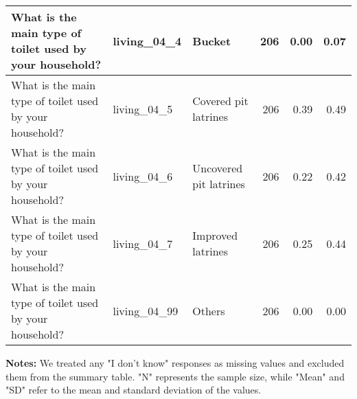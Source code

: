 \begin{landscape}
\begin{longtable}{|p{10cm}|l|p{3cm}|r|r|r|}
\hline
What is the main type of toilet used by your household? & living\_04\_4 & Bucket & 206 & 0.00 & 0.07 \\ 
\hline
What is the main type of toilet used by your household? & living\_04\_5 & Covered pit latrines & 206 & 0.39 & 0.49 \\ 
\hline
What is the main type of toilet used by your household? & living\_04\_6 & Uncovered pit latrines & 206 & 0.22 & 0.42 \\ 
\hline
What is the main type of toilet used by your household? & living\_04\_7 & Improved latrines & 206 & 0.25 & 0.44 \\ 
\hline
What is the main type of toilet used by your household? & living\_04\_99 & Others & 206 & 0.00 & 0.00 \\ 
\bottomrule
\end{longtable}
\noindent \hspace{2.5cm} \parbox{0.9\textwidth}{\textbf{Notes:} We treated any "I don't know" responses as missing values and excluded them from the summary table. "N" represents the sample size, while "Mean" and "SD" refer to the mean and standard deviation of the values.}






\end{landscape}
\restoregeometry